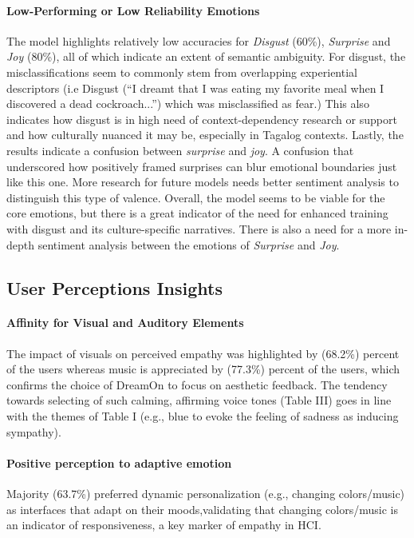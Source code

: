 \documentclass[conference]{IEEEtran}
\begin{document}
    \paragraph{Low-Performing or Low Reliability Emotions}
    The model highlights relatively low accuracies for \textit{Disgust} (60\%), \textit{Surprise} and \textit{Joy} (80\%), all of which indicate an extent of semantic ambiguity. For disgust, the misclassifications seem to commonly stem from overlapping experiential descriptors (i.e  Disgust (“I dreamt that
I was eating my favorite meal when I discovered a dead
cockroach...”) which was misclassified as fear.) This also indicates how disgust is in high need of context-dependency research or support and how culturally nuanced it may be, especially in Tagalog contexts.
Lastly, the results indicate a confusion between \textit{surprise} and \textit{joy}. A confusion that underscored how positively framed surprises can blur emotional boundaries just like this one. More research for future models needs better sentiment analysis to distinguish this type of valence. 
\newline 
Overall, the model seems to be viable for the core emotions, but there is a great indicator of the need for enhanced training with disgust and its culture-specific narratives. There is also a need for a more in-depth sentiment analysis between the emotions of \textit{Surprise} and \textit{Joy}.

\subsection{\textbf{User Perceptions Insight}s}
\paragraph{\textbf{Affinity for Visual and Auditory Elements}}
The impact of visuals on perceived empathy was highlighted by (68.2\%) percent of the users whereas music is appreciated by (77.3\%) percent of the users, which confirms the choice of DreamOn to focus on aesthetic feedback. The tendency towards selecting of such calming, affirming voice tones (Table III) goes in line with the themes of Table I (e.g., blue to evoke the feeling of sadness as inducing sympathy).

\paragraph{\textbf{Positive perception to adaptive emotion}}
Majority (63.7\%) preferred dynamic personalization (e.g., changing colors/music) as interfaces that adapt on their moods,validating that changing colors/music is an indicator of responsiveness, a key marker of empathy in HCI.  
\end{document}
